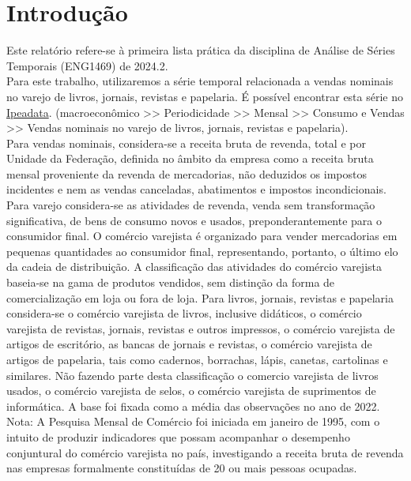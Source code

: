 \documentclass[a4paper, 12pt]{article}
\begin{document}
\newpage


\newpage

\listoffigures
\thispagestyle{empty}

\newpage

\newpage

\thispagestyle{empty}

\newpage

\section*{Introdução}
Este relatório refere-se à primeira lista prática da disciplina de Análise de Séries Temporais (ENG1469) de 2024.2.\\

Para este trabalho, utilizaremos a série temporal relacionada a vendas nominais no varejo de livros, jornais, revistas e papelaria. É possível encontrar esta série no \href{http://ipeadata.gov.br/Default.aspx}{Ipeadata}. (macroeconômico >> Periodicidade >> Mensal >> Consumo e Vendas >> Vendas nominais no varejo de livros, jornais, revistas e papelaria).\\


Para vendas nominais, considera-se a receita bruta de revenda, total e por Unidade da Federação, definida no âmbito da empresa como a receita bruta mensal proveniente da revenda de mercadorias, não deduzidos os impostos incidentes e nem as vendas canceladas, abatimentos e impostos incondicionais. Para varejo considera-se as atividades de revenda, venda sem transformação significativa, de bens de consumo novos e usados, preponderantemente para o consumidor final. O comércio varejista é organizado para vender mercadorias em pequenas quantidades ao consumidor final, representando, portanto, o último elo da cadeia de distribuição. A classificação das atividades do comércio varejista baseia-se na gama de produtos vendidos, sem distinção da forma de comercialização em loja ou fora de loja. Para livros, jornais, revistas e papelaria considera-se o comércio varejista de livros, inclusive didáticos, o comércio varejista de revistas, jornais, revistas e outros impressos, o comércio varejista de artigos de escritório, as bancas de jornais e revistas, o comércio varejista de artigos de papelaria, tais como cadernos, borrachas, lápis, canetas, cartolinas e similares. Não fazendo parte desta classificação o comercio varejista de livros usados, o comércio varejista de selos, o comércio varejista de suprimentos de informática. A base foi fixada como a média das observações no ano de 2022. Nota: A Pesquisa Mensal de Comércio foi iniciada em janeiro de 1995, com o intuito de produzir indicadores que possam acompanhar o desempenho conjuntural do comércio varejista no país, investigando a receita bruta de revenda nas empresas formalmente constituídas de 20 ou mais pessoas ocupadas.\\
\end{document}
